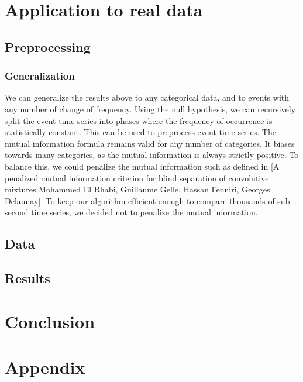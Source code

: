 \documentclass[12pt,a4paper]{article}
\begin{document}
\section{Application to real data}

\subsection{Preprocessing}

\subsubsection*{Generalization}
We can generalize the results above to any categorical data, and to events with any number of change of frequency. Using the null hypothesis, we can recursively split the event time series into phases where the frequency of occurrence is statistically constant. This can be used to preprocess event time series.
The mutual information formula remains valid for any number of categories. It biases towards many categories, as the mutual information is always strictly positive. To balance this, we could penalize the mutual information such as defined in [A penalized mutual information criterion for blind separation of convolutive mixtures Mohammed El Rhabi, Guillaume Gelle, Hassan Fenniri, Georges Delaunay]. To keep our algorithm efficient enough to compare thousands of sub-second time series, we decided not to penalize the mutual information.

\subsection{Data}

\subsection{Results}

\section*{Conclusion}

\newpage

\section*{Appendix}
\label{sec:appendix}

\setcounter{section}{0}
\renewcommand\thesection{\Alph{section}}
\end{document}
